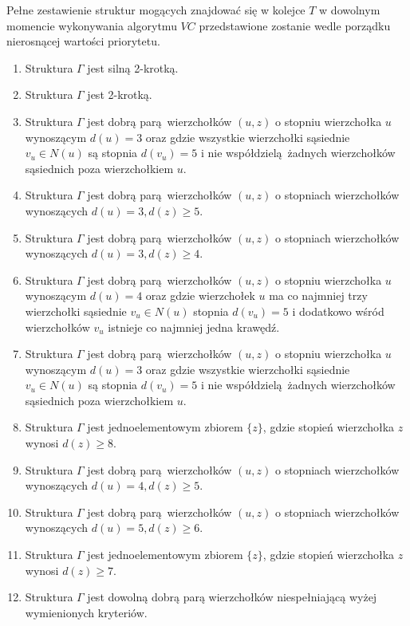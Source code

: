 {  Pełne zestawienie struktur mogących znajdować się w kolejce $T$ w dowolnym momencie wykonywania algorytmu $VC$ przedstawione zostanie wedle porządku nierosnącej wartości priorytetu.
  \begin{enumerate}[(1)]
    \item Struktura $\Gamma$ jest silną 2-krotką.
    \item Struktura $\Gamma$ jest 2-krotką.
    \item Struktura $\Gamma$ jest dobrą parą wierzchołków $(u, z)$ o stopniu wierzchołka $u$ wynoszącym $d(u)=3$ oraz gdzie wszystkie wierzchołki sąsiednie $v_u \in N(u)$ są stopnia $d(v_u)=5$ i nie współdzielą żadnych wierzchołków sąsiednich poza wierzchołkiem $u$.
    \item Struktura $\Gamma$ jest dobrą parą wierzchołków $(u, z)$ o stopniach wierzchołków wynoszących $d(u)=3, d(z) \geq 5$.
    \item Struktura $\Gamma$ jest dobrą parą wierzchołków $(u, z)$ o stopniach wierzchołków wynoszących $d(u)=3, d(z) \geq 4$.
    \item Struktura $\Gamma$ jest dobrą parą wierzchołków $(u, z)$ o stopniu wierzchołka $u$ wynoszącym $d(u)=4$ oraz gdzie wierzchołek $u$ ma co najmniej trzy wierzchołki sąsiednie $v_u \in N(u)$ stopnia $d(v_u)=5$ i dodatkowo wśród wierzchołków $v_u$ istnieje co najmniej jedna krawędź.
    \item Struktura $\Gamma$ jest dobrą parą wierzchołków $(u, z)$ o stopniu wierzchołka $u$ wynoszącym $d(u)=3$ oraz gdzie wszystkie wierzchołki sąsiednie $v_u \in N(u)$ są stopnia $d(v_u)=5$ i nie współdzielą żadnych wierzchołków sąsiednich poza wierzchołkiem $u$.
    \item Struktura $\Gamma$ jest jednoelementowym zbiorem $\{z\}$, gdzie stopień wierzchołka $z$ wynosi $d(z) \geq 8$.
    \item Struktura $\Gamma$ jest dobrą parą wierzchołków $(u, z)$ o stopniach wierzchołków wynoszących $d(u)=4, d(z) \geq 5$.
    \item Struktura $\Gamma$ jest dobrą parą wierzchołków $(u, z)$ o stopniach wierzchołków wynoszących $d(u)=5, d(z) \geq 6$.
    \item Struktura $\Gamma$ jest jednoelementowym zbiorem $\{z\}$, gdzie stopień wierzchołka $z$ wynosi $d(z) \geq 7$.
    \item Struktura $\Gamma$ jest dowolną dobrą parą wierzchołków niespełniającą wyżej wymienionych kryteriów.
  \end{enumerate}

}
